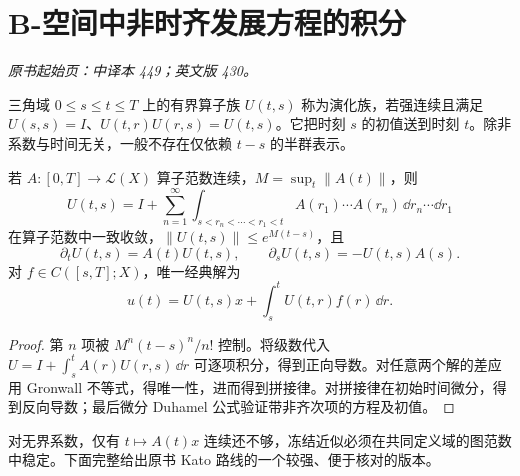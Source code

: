 \section{B-空间中非时齐发展方程的积分}\label{sec:yosida-14-04}
\noindent\textit{原书起始页：中译本 449；英文版 430。}

\begin{definition}[演化族]
三角域 $0\le s\le t\le T$ 上的有界算子族 $U(t,s)$ 称为演化族，若强连续且满足 $U(s,s)=I$、$U(t,r)U(r,s)=U(t,s)$。它把时刻 $s$ 的初值送到时刻 $t$。除非系数与时间无关，一般不存在仅依赖 $t-s$ 的半群表示。
\end{definition}

\begin{theorem}[有界系数的时间有序积分]\label{thm:y14-bounded-evolution}
若 $A:[0,T]\to\mathcal L(X)$ 算子范数连续，$M=\sup_t\|A(t)\|$，则
\[
 U(t,s)=I+\sum_{n=1}^\infty
 \int_{s<r_n<\cdots<r_1<t}A(r_1)\cdots A(r_n)\,\dd r_n\cdots\dd r_1
\]
在算子范数中一致收敛，$\|U(t,s)\|\le e^{M(t-s)}$，且
\[
 \partial_tU(t,s)=A(t)U(t,s),\qquad
 \partial_sU(t,s)=-U(t,s)A(s).
\]
对 $f\in C([s,T];X)$，唯一经典解为
\[
 u(t)=U(t,s)x+\int_s^tU(t,r)f(r)\,\dd r.
\]
\end{theorem}
\begin{proof}
第 $n$ 项被 $M^n(t-s)^n/n!$ 控制。将级数代入 $U=I+\int_s^tA(r)U(r,s)\,\dd r$ 可逐项积分，得到正向导数。对任意两个解的差应用 Gronwall 不等式，得唯一性，进而得到拼接律。对拼接律在初始时间微分，得到反向导数；最后微分 Duhamel 公式验证带非齐次项的方程及初值。
\end{proof}

对无界系数，仅有 $t\mapsto A(t)x$ 连续还不够，冻结近似必须在共同定义域的图范数中稳定。下面完整给出原书 Kato 路线的一个较强、便于核对的版本。

